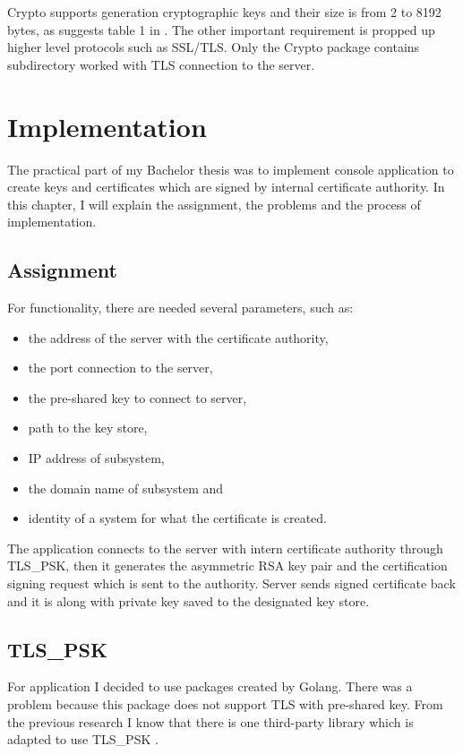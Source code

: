 \documentclass[
  digital, %
  notable,   %
  lof,     %
  lot,     %
]{fithesis3}
\begin{document}
Crypto supports generation cryptographic keys and their size is from 2 to 8192 bytes, as suggests 
table 1 in \cite{hinek2008security}. The other important requirement is propped up higher level 
protocols such as SSL/TLS. Only the Crypto package contains subdirectory worked with TLS connection 
to the server.

\chapter{Implementation}
The practical part of my Bachelor thesis was to implement console application to create keys and 
certificates which are signed by internal certificate authority. In this chapter, I will explain the 
assignment, the problems and the process of implementation. 

\section{Assignment}
For functionality, there are needed several parameters, such as:
\begin{itemize}[leftmargin=2em,rightmargin=1em,itemsep=0.75\parskip,parsep=0em,topsep=0em,partopsep=0em]
\item the address of the server with the certificate authority,
\item the port connection to the server,
\item the pre-shared key to connect to server,
\item path to the key store,
\item IP address of subsystem,
\item the domain name of subsystem and 
\item identity of a system for what the certificate is created.
\end{itemize}
\vskip 0.1in
The application connects to the server with intern certificate authority through 
TLS\_PSK, then it generates the asymmetric RSA key pair and the certification signing 
request which is sent to the authority. Server sends signed certificate back and it is 
along with private key saved to the designated key store.

\section{TLS\_PSK}
For application I decided to use packages created by Golang. There was a problem 
because this package does not support TLS with pre-shared key. From the previous 
research I know that there is one third-party library which is adapted to use TLS\_PSK 
\cite{raff}. 
\end{document}

